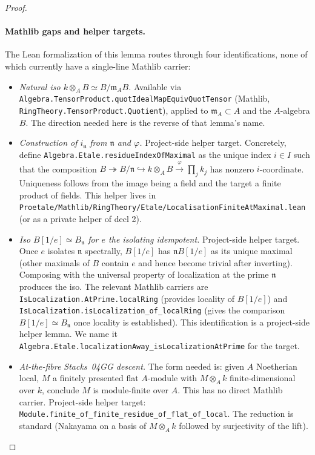 \begin{proof}
\paragraph{Mathlib gaps and helper targets.}
The Lean formalization of this lemma routes through four
identifications, none of which currently have a single-line
Mathlib carrier:
\begin{itemize}
  \item \emph{Natural iso $k \otimes_A B \simeq B / \mathfrak m_A B$.}
    Available via
    \texttt{Algebra.TensorProduct.quotIdealMapEquivQuotTensor}
    (Mathlib, \texttt{RingTheory.TensorProduct.Quotient}), applied
    to $\mathfrak m_A \subset A$ and the $A$-algebra $B$. The
    direction needed here is the reverse of that lemma's name.
  \item \emph{Construction of $i_{\mathfrak n}$ from $\mathfrak n$
    and $\varphi$.} Project-side helper target. Concretely,
    define \texttt{Algebra.Etale.residueIndexOfMaximal} as the
    unique index $i \in I$ such that the composition
    $B \twoheadrightarrow B/\mathfrak n \hookrightarrow
    k \otimes_A B \xrightarrow{\varphi} \prod_j k_j$ has nonzero
    $i$-coordinate. Uniqueness follows from the image being a
    field and the target a finite product of fields. This helper
    lives in
    \texttt{Proetale/Mathlib/RingTheory/Etale/LocalisationFiniteAtMaximal.lean}
    (or as a private helper of decl 2).
  \item \emph{Iso $B[1/e] \simeq B_{\mathfrak n}$ for $e$ the
    isolating idempotent.} Project-side helper target. Once $e$
    isolates $\mathfrak n$ spectrally, $B[1/e]$ has
    $\mathfrak n B[1/e]$ as its unique maximal (other maximals of
    $B$ contain $e$ and hence become trivial after inverting).
    Composing with the universal property of localization at the
    prime $\mathfrak n$ produces the iso. The relevant Mathlib
    carriers are \texttt{IsLocalization.AtPrime.localRing}
    (provides locality of $B[1/e]$) and
    \texttt{IsLocalization.isLocalization\_of\_localRing} (gives
    the comparison $B[1/e] \simeq B_{\mathfrak n}$ once locality
    is established). This identification is a project-side helper
    lemma. We name it
    \texttt{Algebra.Etale.localizationAway\_isLocalizationAtPrime}
    for the target.
  \item \emph{At-the-fibre Stacks~04GG descent.} The form needed
    is: given $A$ Noetherian local, $M$ a finitely presented flat
    $A$-module with $M \otimes_A k$ finite-dimensional over $k$,
    conclude $M$ is module-finite over $A$. This has no direct
    Mathlib carrier. Project-side helper target:
    \texttt{Module.finite\_of\_finite\_residue\_of\_flat\_of\_local}.
    The reduction is standard (Nakayama on a basis of
    $M \otimes_A k$ followed by surjectivity of the lift).
\end{itemize}
\end{proof}

